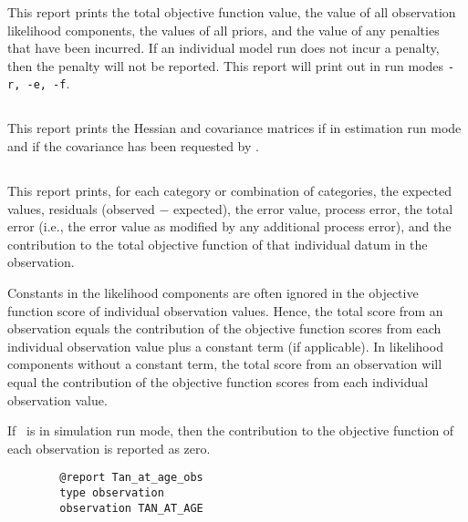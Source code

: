 This report prints the total objective function value, the value of all observation likelihood components, the values of all priors, and the value of any penalties that have been incurred. If an individual model run does not incur a penalty, then the penalty will not be reported. This report will print out in run modes \texttt{-r, -e, -f}.

\subsection{}

This report prints the Hessian and covariance matrices if in estimation run mode and if the covariance has been requested by .

\subsection{}

This report prints, for each category or combination of categories, the expected values, residuals (observed $-$ expected), the error value, process error, the total error (i.e., the error value as modified by any additional process error), and the contribution to the total objective function of that individual datum in the observation.

Constants in the likelihood components are often ignored in the objective function score of individual observation values. Hence, the total score from an observation equals the contribution of the objective function scores from each individual observation value plus a constant term (if applicable). In likelihood components without a constant term, the total score from an observation will equal the contribution of the objective function scores from each individual observation value.

If \CNAME\ is in simulation run mode, then the contribution to the objective function of each observation is reported as zero.

\begin{verbatim}
		@report Tan_at_age_obs
		type observation
		observation TAN_AT_AGE
\end{verbatim}

\subsection{}

